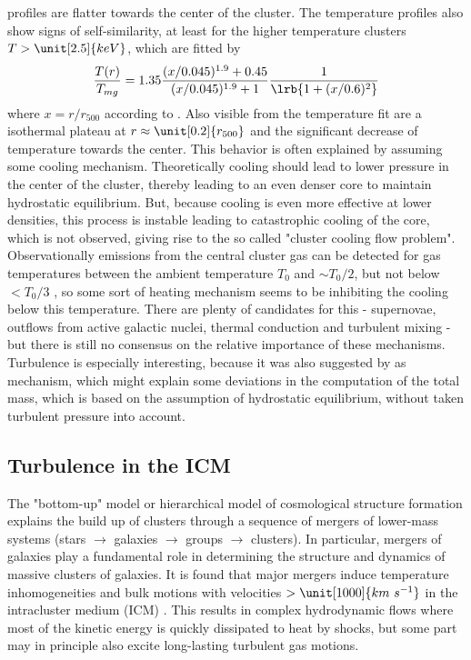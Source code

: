 profiles are flatter towards the center of the cluster. The temperature
profiles also show signs of self-similarity, at least for the higher
temperature clusters $T > \unit[2.5]{keV}$, which are fitted by
\begin{align}
\frac{T(r)}{T_{mg}} = 1.35 \frac{(x/0.045)^{1.9} + 0.45}{(x/0.045)^{1.9}+1}
\frac{1}{\lrb{1+(x/0.6)^2}} 
\end{align}
where $x=r/r_{500}$ according to \citep{Vikhlinin2006}. Also visible from the
temperature fit are a isothermal plateau at $r \approx \unit[0.2]{r_{500}}$ and
the significant decrease of temperature towards the center. This behavior is
often
explained by assuming some cooling mechanism. Theoretically cooling
should lead to lower pressure in the center of the cluster, thereby leading to
an even denser core to maintain hydrostatic equilibrium. But, because cooling is
even more effective at lower densities, this process is instable leading to
catastrophic cooling of the core, which is not observed, giving rise to the
so called "cluster cooling flow problem". Observationally emissions from the
central cluster gas can be detected for gas temperatures between the ambient
temperature $T_0$ and $\sim T_0/2$, but not below $<T_0/3$ \citep{Peterson2003},
so some sort of heating mechanism seems to be inhibiting the cooling below this 
temperature. There are plenty of candidates for this - supernovae, outflows
from active galactic nuclei, thermal conduction and turbulent mixing - but
there is still no consensus on the relative importance of these mechanisms.
Turbulence is especially interesting, because it was also
suggested by \citet{Nagai2007} as mechanism, which might explain some
deviations in the computation of the total mass,
which is based on the assumption of hydrostatic equilibrium, without taken
turbulent pressure into account. 

\subsection{Turbulence in the ICM}
The "bottom-up" model or hierarchical model of cosmological structure formation
\citep[eg.,][]{Ostriker1993} explains the build up of clusters through a
sequence of mergers of lower-mass systems (stars $\rightarrow$ galaxies
$\rightarrow$ groups $\rightarrow$ clusters). In particular, mergers of galaxies
play a fundamental role in 
determining the structure and dynamics of massive clusters of galaxies. It is
found that major mergers induce temperature inhomogeneities and bulk motions
with velocities $> \unit[1000]{km\ s^{-1}}$ in the intracluster medium (ICM)
\citep{Norman1999a}. This results in complex hydrodynamic flows where most of
the kinetic energy is quickly dissipated to heat by shocks, but some part may in
principle also excite long-lasting turbulent gas motions.

